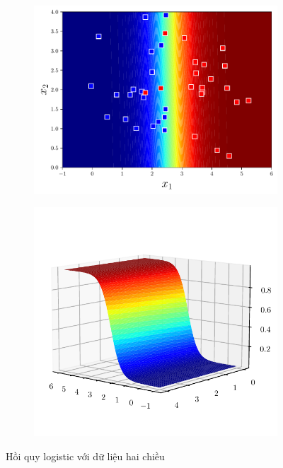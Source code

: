 \documentclass{article}
\begin{document}
\begin{figure}[ht!]
    \centering
    \begin{subfigure}[b]{0.45\linewidth}
        \includegraphics[width = \linewidth]{logistic_2d_3.pdf}
        \label{fig16a}
    \end{subfigure}
    \begin{subfigure}[b]{0.45\linewidth}
        \includegraphics[width = \linewidth]{logistic_2d_4.pdf}
        \label{fig16b}
    \end{subfigure}
    \caption{Hồi quy logistic với dữ liệu hai chiều}
    \label{fig16}
\end{figure}
\end{document}
